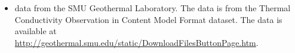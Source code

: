 \begin{itemize}
\item data from the SMU Geothermal Laboratory. The data is from the Thermal Conductivity Observation in Content Model Format dataset. The data is available at \href{http://geothermal.smu.edu/static/DownloadFilesButtonPage.htm}{http://geothermal.smu.edu/static/DownloadFilesButtonPage.htm}.
\end{itemize}
